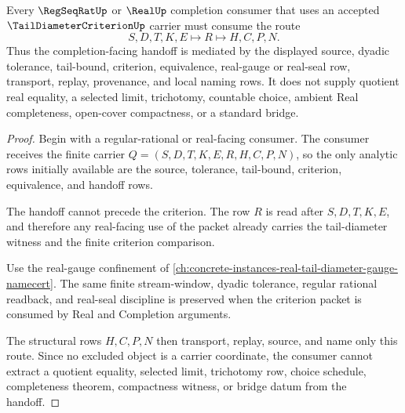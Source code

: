 \begin{theorem}
\label{thm:tail-diameter-criterion-real-seal-handoff}
Every $\RegSeqRatUp$ or $\RealUp$ completion consumer that uses an accepted $\TailDiameterCriterionUp$ carrier must consume the route
$$
S,D,T,K,E \longmapsto R \longmapsto H,C,P,N .
$$
Thus the completion-facing handoff is mediated by the displayed source, dyadic tolerance, tail-bound, criterion, equivalence, real-gauge or real-seal row, transport, replay, provenance, and local naming rows. It does not supply quotient real equality, a selected limit, trichotomy, countable choice, ambient Real completeness, open-cover compactness, or a standard bridge.
\end{theorem}
\begin{proof}
Begin with a regular-rational or real-facing consumer. The consumer receives the finite carrier $Q=(S,D,T,K,E,R,H,C,P,N)$, so the only analytic rows initially available are the source, tolerance, tail-bound, criterion, equivalence, and handoff rows.

The handoff cannot precede the criterion. The row $R$ is read after $S,D,T,K,E$, and therefore any real-facing use of the packet already carries the tail-diameter witness and the finite criterion comparison.

Use the real-gauge confinement of \autoref{ch:concrete-instances-real-tail-diameter-gauge-namecert}. The same finite stream-window, dyadic tolerance, regular rational readback, and real-seal discipline is preserved when the criterion packet is consumed by Real and Completion arguments.

The structural rows $H,C,P,N$ then transport, replay, source, and name only this route. Since no excluded object is a carrier coordinate, the consumer cannot extract a quotient equality, selected limit, trichotomy row, choice schedule, completeness theorem, compactness witness, or bridge datum from the handoff.
\end{proof}


